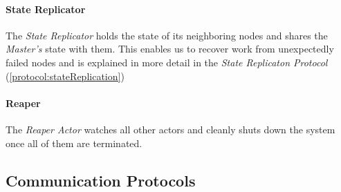 \paragraph{State Replicator}
The \emph{State Replicator} holds the state of its neighboring nodes and shares the \emph{Master's} state with them. 
This enables us to recover work from unexpectedly failed nodes and is explained in more detail in the \emph{State Replicaton Protocol} (\ref{protocol:stateReplication})

\paragraph{Reaper} 
The \emph{Reaper Actor} watches all other actors and cleanly shuts down the system once all of them are terminated.

\subsection{Communication Protocols}

